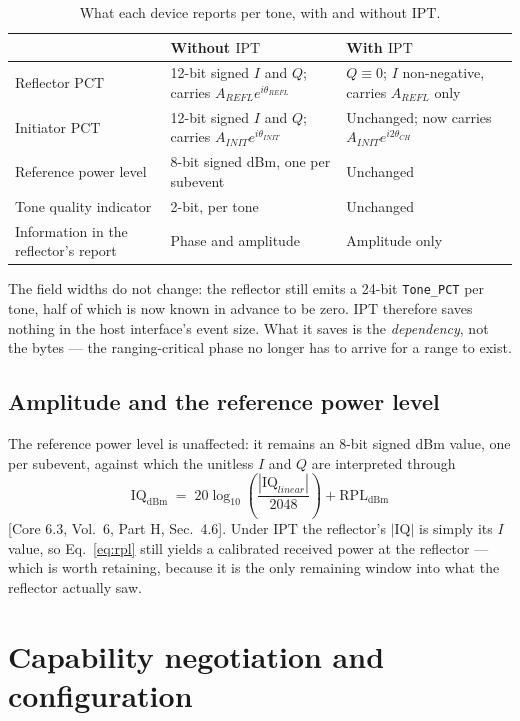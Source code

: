 \documentclass[11pt,a4paper]{article}
\newcommand{\PCT}{\ensuremath{\mathrm{PCT}}}
\newcommand{\IPT}{\ensuremath{\mathrm{IPT}}}
\newcommand{\RPL}{\ensuremath{\mathrm{RPL}}}
\newcommand{\code}[1]{\texttt{\small #1}}
\newcommand{\core}[1]{\textcolor{rulegrey}{\small[Core 6.3, #1]}}
\begin{document}
\begin{table}[h]
\caption{What each device reports per tone, with and without \IPT.}
\label{tab:reporting}
\centering\small
\begin{tabular}{@{}L{30mm}L{45mm}L{45mm}@{}}
\toprule
 & Without \IPT & With \IPT \\
\midrule
Reflector $\PCT$ & 12-bit signed $I$ and $Q$; carries $A_{REFL}e^{i\theta_{REFL}}$ & $Q \equiv 0$; $I$ non-negative, carries $A_{REFL}$ only \\
Initiator $\PCT$ & 12-bit signed $I$ and $Q$; carries $A_{INIT}e^{i\theta_{INIT}}$ & Unchanged; now carries $A_{INIT}e^{i2\theta_{CH}}$ \\
Reference power level & 8-bit signed dBm, one per subevent & Unchanged \\
Tone quality indicator & 2-bit, per tone & Unchanged \\
Information in the reflector's report & Phase and amplitude & Amplitude only \\
\bottomrule
\end{tabular}
\end{table}

The field widths do not change: the reflector still emits a 24-bit \code{Tone\_PCT} per tone, half of
which is now known in advance to be zero. \IPT{} therefore saves nothing in the host interface's
event size. What it saves is the \emph{dependency}, not the bytes --- the ranging-critical phase no
longer has to arrive for a range to exist.

\subsection{Amplitude and the reference power level}

The reference power level is unaffected: it remains an 8-bit signed dBm value, one per subevent,
against which the unitless $I$ and $Q$ are interpreted through
\begin{equation}
\mathrm{IQ}_{\mathrm{dBm}} \;=\; 20\log_{10}\!\left(\frac{|\mathrm{IQ}_{linear}|}{2048}\right) + \RPL_{\mathrm{dBm}}
\label{eq:rpl}
\end{equation}
\core{Vol.\ 6, Part H, Sec.\ 4.6}. Under \IPT{} the reflector's $|\mathrm{IQ}|$ is simply its $I$
value, so Eq.~\eqref{eq:rpl} still yields a calibrated received power at the reflector --- which is
worth retaining, because it is the only remaining window into what the reflector actually saw.
\section{Capability negotiation and configuration}
\label{sec:negotiation}
\end{document}
